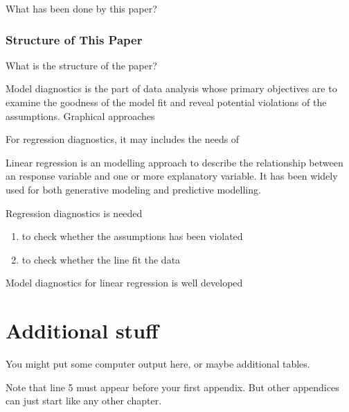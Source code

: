 \documentclass{monashthesis}
\begin{document}
What has been done by this paper?

\hypertarget{structure-of-this-paper}{%
\subsection{Structure of This Paper}\label{structure-of-this-paper}}

What is the structure of the paper?

Model diagnostics is the part of data analysis whose primary objectives are to examine the goodness of the model fit and reveal potential violations of the assumptions. Graphical approaches

For regression diagnostics, it may includes the needs of

Linear regression is an modelling approach to describe the relationship between an response variable and one or more explanatory variable. It has been widely used for both generative modeling and predictive modelling.

Regression diagnostics is needed

\begin{enumerate}
\def\labelenumi{\arabic{enumi}.}
\tightlist
\item
  to check whether the assumptions has been violated
\item
  to check whether the line fit the data
\end{enumerate}

Model diagnostics for linear regression is well developed

\appendix

\hypertarget{additional-stuff}{%
\chapter{Additional stuff}\label{additional-stuff}}

You might put some computer output here, or maybe additional tables.

Note that line 5 must appear before your first appendix. But other appendices can just start like any other chapter.

\printbibliography[heading=bibintoc]
\end{document}
